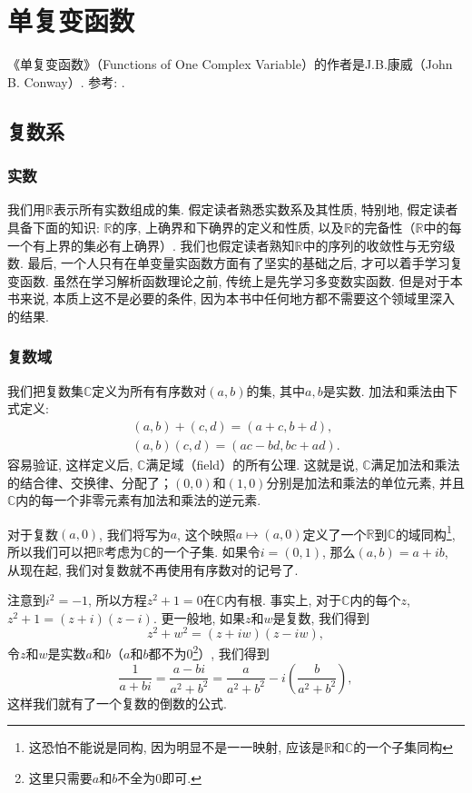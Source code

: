 \part{单复变函数}
《单复变函数》（Functions of One Complex Variable）的作者是J.B.康威（John B. Conway）. 参考: \cite{FunctionsofOneComplexVariable1978}. 

\chapter{复数系}\label{section00201}

\section{实数}\label{subsection0020101}
我们用$\mathbb{R}$表示所有实数组成的集. 假定读者熟悉实数系及其性质, 特别地, 假定读者具备下面的知识: $\mathbb{R}$的序, 上确界和下确界的定义和性质, 以及$\mathbb{R}$的完备性（$\mathbb{R}$中的每一个有上界的集必有上确界）. 我们也假定读者熟知$\mathbb{R}$中的序列的收敛性与无穷级数. 最后, 一个人只有在单变量实函数方面有了坚实的基础之后, 才可以着手学习复变函数. 虽然在学习解析函数理论之前, 传统上是先学习多变数实函数. 但是对于本书来说, 本质上这不是必要的条件, 因为本书中任何地方都不需要这个领域里深入的结果. 

\section{复数域}\label{subsection0020102}
我们把复数集$\mathbb{C}$定义为所有有序数对$(a, b)$的集, 其中$a,b$是实数. 加法和乘法由下式定义: 
\begin{gather*}
(a, b) + (c, d) = (a+c, b+d), \\
(a, b)(c, d) = (ac-bd, bc + ad).
\end{gather*}
容易验证, 这样定义后, $\mathbb{C}$满足域（field）的所有公理. 这就是说, $\mathbb{C}$满足加法和乘法的结合律、交换律、分配了；$(0, 0)$和$(1,0)$分别是加法和乘法的单位元素, 并且$\mathbb{C}$内的每一个非零元素有加法和乘法的逆元素. 

对于复数$(a, 0)$, 我们将写为$a$, 这个映照$a \mapsto (a, 0)$定义了一个$\mathbb{R}$到$\mathbb{C}$的域同构\footnote{这恐怕不能说是同构, 因为明显不是一一映射, 应该是$\mathbb{R}$和$\mathbb{C}$的一个子集同构}, 所以我们可以把$\mathbb{R}$考虑为$\mathbb{C}$的一个子集. 如果令$i=(0, 1)$, 那么$(a, b) = a + ib$, 从现在起, 我们对复数就不再使用有序数对的记号了. 

注意到$i^2=-1$, 所以方程$z^2+1=0$在$\mathbb{C}$内有根. 事实上, 对于$\mathbb{C}$内的每个$z$, $z^2+1=(z+i)(z-i)$. 更一般地, 如果$z$和$w$是复数, 我们得到
\[
z^2+w^2 = (z+iw)(z-iw),
\]
令$z$和$w$是实数$a$和$b$（$a$和$b$都不为0\footnote{这里只需要$a$和$b$不全为0即可. }）, 我们得到
\[
\frac{1}{a+bi} = \frac{a-bi}{a^2+b^2} = \frac{a}{a^2+b^2} - i(\frac{b}{a^2+b^2}),
\]
这样我们就有了一个复数的倒数的公式. 

